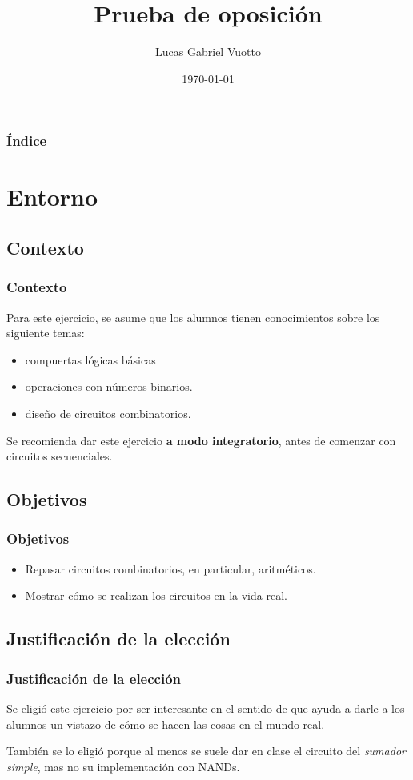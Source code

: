 \documentclass[mathserif,hyperref]{beamer}
\title{Prueba de oposición}
\author{Lucas Gabriel Vuotto}
\date{\today}
\begin{document}
\begin{frame}
\titlepage %
\end{frame}


\begin{frame}
\frametitle{Índice}
\tableofcontents
\end{frame}


\section{Entorno}

\subsection{Contexto}
\begin{frame}
\frametitle{Contexto}
Para este ejercicio, se asume que los alumnos tienen conocimientos sobre los
siguiente temas:
\begin{itemize}
  \item compuertas lógicas básicas
  \item operaciones con números binarios.
  \item diseño de circuitos combinatorios.
\end{itemize}

\vspace{0.5cm}
Se recomienda dar este ejercicio \textbf{a modo integratorio}, antes de
comenzar con circuitos secuenciales.
\end{frame}


\subsection{Objetivos}
\begin{frame}
\frametitle{Objetivos}
\begin{itemize}
  \item Repasar circuitos combinatorios, en particular, aritméticos.
  \item Mostrar cómo se realizan los circuitos en la vida real.
\end{itemize}
\end{frame}


\subsection{Justificación de la elección}
\begin{frame}
\frametitle{Justificación de la elección}
Se eligió este ejercicio por ser interesante en el sentido de que ayuda a
darle a los alumnos un vistazo de cómo se hacen las cosas en el mundo real.

\vspace{0.5cm}
También se lo eligió porque al menos se suele dar en clase el circuito del
\textit{sumador simple}, mas no su implementación con NANDs.
\end{frame}
\end{document}
